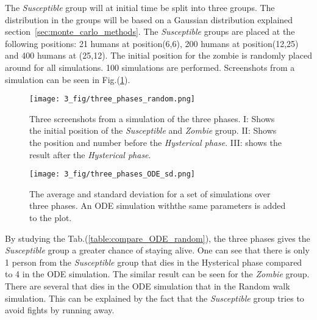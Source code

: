 \documentclass[%
twoside,                 %
final,                   %
chapterprefix=true,      %
open=right               %
10pt]{book}
\begin{document}
\vspace{3mm}




\vspace{3mm}


The \emph{Susceptible} group will at initial time be split into three groups. The distribution in the groups will be based on a Gaussian distribution explained section~\ref{sec:monte_carlo_methods}. The \emph{Susceptible} groups are placed at the following positions: 21 humans at position(6,6), 200 humans at position(12,25) and 400 humans at (25,12). The initial position for the zombie is randomly placed around for all simulations. 100 simulations are performed. Screenshots from a simulation can be seen in Fig.(\ref{fig:screenshots_three_phases}). 


\vspace{3mm}




\vspace{3mm}




\begin{figure}[ht]
  \centerline{\texttt{[image: 3\_fig/three\_phases\_random.png]}}
  \caption{
  \label{fig:screenshots_three_phases} Three screenshots from a simulation of the three phases. I: Shows the initial position of the \emph{Susceptible} and \emph{Zombie} group. II: Shows the position and number before the \emph{Hysterical phase}. III: shows the result after the \emph{Hysterical phase}.
  }
\end{figure}





\begin{figure}[ht]
  \centerline{\texttt{[image: 3\_fig/three\_phases\_ODE\_sd.png]}}
  \caption{
  The average and standard deviation for a set of simulations over three phases. An ODE simulation withthe same parameters is added to the plot.
  }
\end{figure}



By studying the Tab.(\ref{table:compare_ODE_random}), the three phases gives the \emph{Susceptible} group a greater chance of staying alive. One can see that there is only 1 person from the \emph{Susceptible} group that dies in the Hysterical phase compared to 4 in the ODE simulation. The similar result can be seen for the \emph{Zombie} group. There are several that dies in the ODE simulation that in the Random walk simulation. This can be explained by the fact that the \emph{Susceptible} group tries to avoid fights by running away. 
\end{document}
